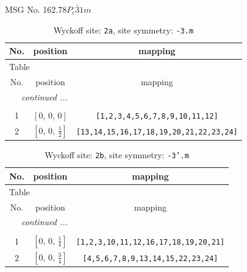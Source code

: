 \documentclass[fleqn,8pt]{jsarticle}
\begin{document}
\setcounter{MaxMatrixCols}{32}

\renewcommand{\tablename}{Table~}
\renewcommand{\figurename}{Figure~}
\begin{center}
\LARGE
MSG No. 162.78\quad$P_{c}\bar{3}1m$
\end{center}
\renewcommand{\arraystretch}{1.2}
\begin{longtable}{ccc}
\caption{Wyckoff site: {\tt 2a}, site symmetry: {\tt -3.m}}
 \\
 \hline \hline
No. & position & mapping \\ \hline \endfirsthead

\multicolumn{2}{l}{\tablename\ \thetable{}} \\
 \hline \hline
No. & position & mapping \\ \hline \endhead

 \hline \hline
\multicolumn{2}{r}{\footnotesize\it continued ...} \\ \endfoot

 \hline \hline
\multicolumn{2}{r}{} \\ \endlastfoot

1 & $\left[ 0,\, 0,\, 0 \right]$ & {\tt [1,2,3,4,5,6,7,8,9,10,11,12]} \\ \hline
2 & $\left[ 0,\, 0,\, \frac{1}{2} \right]$ & {\tt [13,14,15,16,17,18,19,20,21,22,23,24]} \\
\end{longtable}
\renewcommand{\arraystretch}{1.2}
\begin{longtable}{ccc}
\caption{Wyckoff site: {\tt 2b}, site symmetry: {\tt -3'.m}}
 \\
 \hline \hline
No. & position & mapping \\ \hline \endfirsthead

\multicolumn{2}{l}{\tablename\ \thetable{}} \\
 \hline \hline
No. & position & mapping \\ \hline \endhead

 \hline \hline
\multicolumn{2}{r}{\footnotesize\it continued ...} \\ \endfoot

 \hline \hline
\multicolumn{2}{r}{} \\ \endlastfoot

1 & $\left[ 0,\, 0,\, \frac{1}{4} \right]$ & {\tt [1,2,3,10,11,12,16,17,18,19,20,21]} \\ \hline
2 & $\left[ 0,\, 0,\, \frac{3}{4} \right]$ & {\tt [4,5,6,7,8,9,13,14,15,22,23,24]} \\
\end{longtable}
\end{document}

